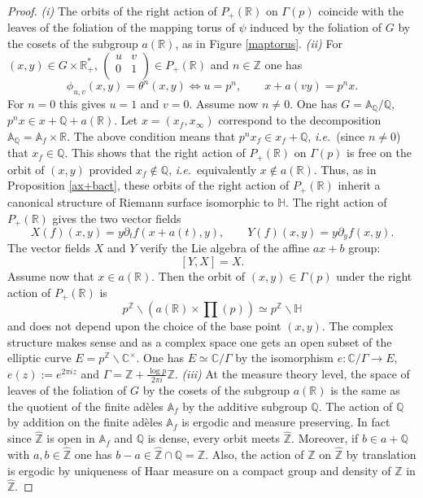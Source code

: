 \documentclass[graybox, envcountsect%
]{svmult}
\def\A{{\mathbb A}}
\def\C{{\mathbb C}}
\def\Q{{\mathbb Q}}
\def\R{{\mathbb R}}
\def\Z{{\mathbb Z}}
\def\H{{\mathbb H}}
\newcommand{\ie}{{\it i.e.\/}\ }
\def\no{\noindent}
\begin{document}
\begin{proof} {\it (i)}
\no The  orbits of the right action of $P_+(\R)$ on $\Gamma(p)$ coincide with the leaves of the foliation of the mapping torus of $\psi$ induced by the foliation of $G$ by the cosets of the subgroup $a(\R)$,  as in Figure \ref{maptorus}. \newline
{\it (ii)} For $(x,y)\in G\times \R_+^*$, $\left(
\begin{array}{cc}
 u & v \\
 0 & 1 \\
\end{array}
\right)\in P_+(\R)$ and $n\in \Z$ one has 
$$
\phi_{u,v}(x,y)=\theta^n(x,y) \iff u=p^n, \qquad x+a(vy)=p^n x.
$$
For $n=0$ this gives $u=1$ and  $v=0$. Assume now $n\neq 0$. One has $G=\A_\Q/\Q$, $p^n x\in x+\Q +a(\R)$. Let $x=(x_f,x_\infty)$ correspond to the decomposition $\A_\Q=\A_f\times \R$. The above condition means that $p^n x_f\in x_f+\Q $, \ie (since $n\neq 0$) that $x_f\in \Q$.
This shows that the right action of  $P_+(\R)$ on  $\Gamma(p)$ is free on the orbit of $(x,y)$ provided $x_f\notin \Q$, \ie equivalently $x\notin a(\R)$. Thus, as in Proposition \ref{ax+bact}, these orbits of the right action of  $P_+(\R)$ inherit a canonical structure of Riemann surface isomorphic to $\H$. The right action of  $P_+(\R)$ gives the two vector fields
\begin{equation}\label{vectorfields}
X(f)(x,y)=y\partial_tf(x+a(t),y), \qquad Y(f)(x,y)=y\partial_yf(x,y). 
\end{equation}
The vector fields $X$ and $Y$ verify the Lie algebra of the affine $ax+b$ group: 
\begin{equation}\label{vectorfields1}
[Y,X]=X.
\end{equation}
  Assume now that $x\in a(\R)$. Then the orbit of $(x,y)\in \Gamma(p)$ under the right action  of  $P_+(\R)$ is
$$
p^\Z\backslash \left(a(\R)\times \prod(p)\right)\simeq p^\Z\backslash \H
$$
and does not depend upon the choice of the base point $(x,y)$. 
The complex structure makes sense and as a complex space one gets an open subset of the elliptic curve $E=p^\Z\backslash \C^\times$. One has $E\simeq \C/\Gamma$ by the isomorphism $e:\C/\Gamma\to E$, $e(z):=e^{2 \pi i z}$ and $\Gamma=\Z+ \frac{\log p}{2\pi i}\Z$.\newline
	{\it (iii)} At the measure theory level, the space of leaves of the foliation of $G$ by the cosets of the subgroup $a(\R)$ is the same as the quotient of the finite ad\`eles $\A_f$ by the additive subgroup $\Q$. The action of $\Q$ by addition on the finite ad\`eles $\A_f$ is ergodic and measure preserving. In fact since $\hat \Z$ is open in
	$\A_f$ and $\Q$ is dense, every orbit meets  $\hat \Z$. Moreover, if $b\in a+\Q$ with $a,b\in \hat\Z$ one has $b-a\in \hat\Z\cap \Q=\Z$. Also, the action of $\Z$ on $\hat \Z$ by translation is ergodic by uniqueness of Haar measure on a compact group and density of $\Z$ in $\hat \Z$. 	
	

\end{proof}
\end{document}

